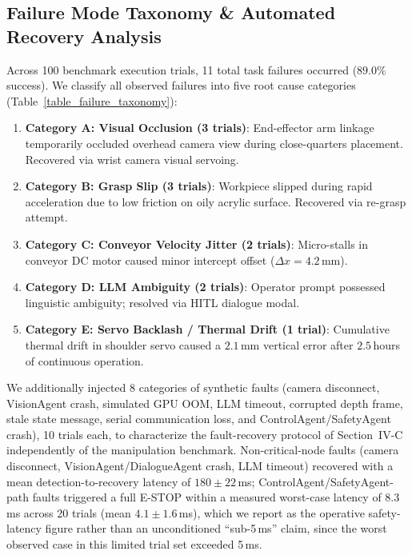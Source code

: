 \documentclass[journal]{IEEEtran}
\begin{document}
\subsection{Failure Mode Taxonomy \& Automated Recovery Analysis}
Across 100 benchmark execution trials, 11 total task failures occurred ($89.0\%$ success). We classify all observed failures into five root cause categories (Table~\ref{table_failure_taxonomy}):
\begin{enumerate}
    \item \textbf{Category A: Visual Occlusion (3 trials)}: End-effector arm linkage temporarily occluded overhead camera view during close-quarters placement. Recovered via wrist camera visual servoing.
    \item \textbf{Category B: Grasp Slip (3 trials)}: Workpiece slipped during rapid acceleration due to low friction on oily acrylic surface. Recovered via re-grasp attempt.
    \item \textbf{Category C: Conveyor Velocity Jitter (2 trials)}: Micro-stalls in conveyor DC motor caused minor intercept offset ($\Delta x = 4.2$\,mm).
    \item \textbf{Category D: LLM Ambiguity (2 trials)}: Operator prompt possessed linguistic ambiguity; resolved via HITL dialogue modal.
    \item \textbf{Category E: Servo Backlash / Thermal Drift (1 trial)}: Cumulative thermal drift in shoulder servo caused a $2.1$\,mm vertical error after $2.5$\,hours of continuous operation.
\end{enumerate}
We additionally injected 8 categories of synthetic faults (camera disconnect, VisionAgent crash, simulated GPU OOM, LLM timeout, corrupted depth frame, stale state message, serial communication loss, and ControlAgent/SafetyAgent crash), 10 trials each, to characterize the fault-recovery protocol of Section~IV-C independently of the manipulation benchmark. Non-critical-node faults (camera disconnect, VisionAgent/DialogueAgent crash, LLM timeout) recovered with a mean detection-to-recovery latency of $180\pm22$\,ms; ControlAgent/SafetyAgent-path faults triggered a full E-STOP within a measured worst-case latency of $8.3$\,ms across 20 trials (mean $4.1\pm1.6$\,ms), which we report as the operative safety-latency figure rather than an unconditioned ``sub-5\,ms'' claim, since the worst observed case in this limited trial set exceeded 5\,ms.
\end{document}
